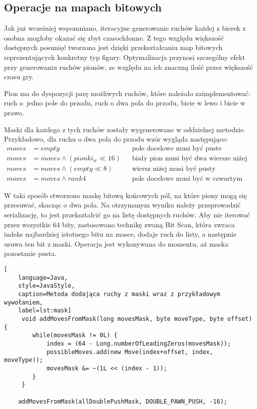 \subsection{Operacje na mapach bitowych}
\label{subsec:operacje-na-mapach-bitowych}

Jak już wcześniej wspomniano, iteracyjne generowanie ruchów każdej z bierek z osobna mogłoby okazać się zbyt czasochłonne.
Z tego względu większość dostępnych posunięć tworzona jest dzięki przekształcaniu map bitowych reprezentujących konkretny typ figury.
Optymalizacja przynosi szczególny efekt przy generowaniu ruchów pionów, ze względu na ich znaczną ilość przez większość czasu gry.

Pion ma do dyspozycji parę możliwych ruchów, które należało zaimplementować: ruch o~jedno pole do przodu, ruch o dwa pola do przodu, bicie w lewo i bicie w prawo.

Maski dla każdego z tych ruchów zostały wygenerowane w oddzielnej metodzie.
Przykładowo, dla ruchu o dwa pola do przodu wzór wygląda następująco:
\begin{align*}
    moves & = empty && \text{pole docelowe musi być puste} \\
    moves & = moves \wedge (pionki_w\ll16) && \text{biały pion musi być dwa wiersze niżej}\\
    moves & = moves \wedge (empty\ll8) && \text{wiersz niżej musi być pusty}\\
    moves & = moves \wedge rank4 && \text{pole docelowe musi być w czwartym wierszu}
\end{align*}

W taki sposób stworzono maskę bitową końcowych pól, na które piony mogą się przesuwać, skacząc o dwa pola.
Na otrzymanym wyniku należy przeprowadzić serializację, to jest przekształcić go na listę dostępnych ruchów.
Aby nie iterować przez wszystkie 64 bity, zastosowano technikę zwaną Bit Scan, która zwraca indeks najbardziej istotnego bitu na masce, dodaje ruch do listy, a następnie usuwa ten bit z maski.
Operacja jest wykonywana do momentu, aż maska pozostanie pusta.
\begin{lstlisting}[
    language=Java,
    style=JavaStyle,
    caption=Metoda dodająca ruchy z maski wraz z przykładowym wywołaniem,
    label=lst:mask]
     void addMovesFromMask(long movesMask, byte moveType, byte offset) {
        while(movesMask != 0L) {
            index = (64 - Long.numberOfLeadingZeros(movesMask));
            possibleMoves.add(new Move(index+offset, index, moveType));
            movesMask &= ~(1L << (index - 1));
        }
     }

    addMovesFromMask(allDoublePushMask, DOUBLE_PAWN_PUSH, -16);

\end{lstlisting}

